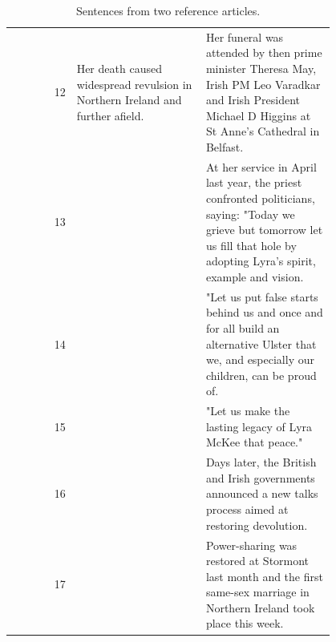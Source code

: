 \begin{table}[!htbp]
\begin{tabular}{r | p{0.4\linewidth} | p{0.4\linewidth} }
        12\vspace{-2px} & \tiny{Her death caused widespread revulsion in Northern Ireland and further afield.}\vspace{-2px} & \tiny{Her funeral was attended by then prime minister Theresa May, Irish PM Leo Varadkar and Irish President Michael D Higgins at St Anne's Cathedral in Belfast.}\vspace{-2px} \\
        13\vspace{-2px} &  & \tiny{At her service in April last year, the priest confronted politicians, saying: "Today we grieve but tomorrow let us fill that hole by adopting Lyra's spirit, example and vision.}\vspace{-2px} \\
        14\vspace{-2px} &  & \tiny{"Let us put false starts behind us and once and for all build an alternative Ulster that we, and especially our children, can be proud of.}\vspace{-2px} \\
        15\vspace{-2px} &  & \tiny{"Let us make the lasting legacy of Lyra McKee that peace."}\vspace{-2px} \\
        16\vspace{-2px} &  & \tiny{Days later, the British and Irish governments announced a new talks process aimed at restoring devolution.}\vspace{-2px} \\
        17\vspace{-2px} &  & \tiny{Power-sharing was restored at Stormont last month and the first same-sex marriage in Northern Ireland took place this week.} \vspace{-2px}
       \end{tabular}
       \caption{Sentences from two reference articles.}
       \label{tab:sentences}
\end{table}



